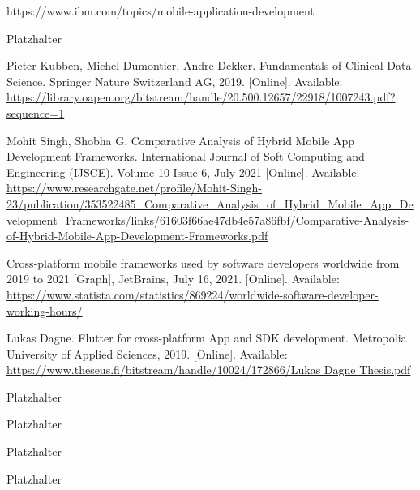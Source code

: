  https://www.ibm.com/topics/mobile-application-development

 Platzhalter

 Pieter Kubben, Michel Dumontier, Andre Dekker. Fundamentals of Clinical Data Science. Springer Nature Switzerland AG, 2019. [Online]. Available: \url{https://library.oapen.org/bitstream/handle/20.500.12657/22918/1007243.pdf?sequence=1}

 Mohit Singh, Shobha G. Comparative Analysis of Hybrid Mobile App Development Frameworks. International Journal of Soft Computing and Engineering (IJSCE). Volume-10 Issue-6, July 2021 [Online]. Available: \url{https://www.researchgate.net/profile/Mohit-Singh-23/publication/353522485_Comparative_Analysis_of_Hybrid_Mobile_App_Development_Frameworks/links/61603f66ae47db4e57a86fbf/Comparative-Analysis-of-Hybrid-Mobile-App-Development-Frameworks.pdf}

 Cross-platform mobile frameworks used by software developers worldwide from 2019 to 2021 [Graph], JetBrains, July 16, 2021. [Online]. Available: \url{https://www.statista.com/statistics/869224/worldwide-software-developer-working-hours/}

 Lukas Dagne. Flutter for cross-platform App and SDK development. Metropolia University of Applied Sciences, 2019. [Online]. Available: \url{https://www.theseus.fi/bitstream/handle/10024/172866/Lukas Dagne Thesis.pdf}

 Platzhalter

 Platzhalter

 Platzhalter

 Platzhalter